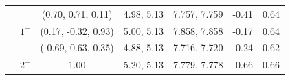 \documentclass[prt,twocolumn,floatfix,nofootinbib]{revtex4}
\begin{document}
\begin{table}[!htbp]
\begin{tabular}{ccccccc}
                        &\multirow{3}{*}{$1^{+}$}
                                    &(0.70, 0.71, 0.11)     &4.98, 5.13	    &7.757, 7.759	    &-0.41                  &0.64 \\
                        &           &(0.17, -0.32, 0.93)    &5.00, 5.13	    &7.858, 7.858	    &-0.17                  &0.64 \\
                        &           &(-0.69, 0.63, 0.35)    &4.88, 5.13	    &7.716, 7.720	    &-0.24                  &0.62 \\
                        &$2^{+}$    &1.00                   &5.20, 5.13	    &7.779, 7.778	    &-0.66                  &0.66 \\
        \hline\hline
    \end{tabular}
\end{table}
\end{document}
